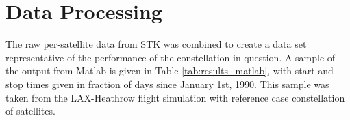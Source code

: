 \section{Data Processing}
\label{sec:data_processing}

The raw per-satellite data from STK was combined to create a data set representative of the performance of the constellation in question. A sample of the output from Matlab is given in Table \ref{tab:results_matlab}, with start and stop times given in fraction of days since January 1st, 1990. This sample was taken from the LAX-Heathrow flight simulation with reference case constellation of satellites.

